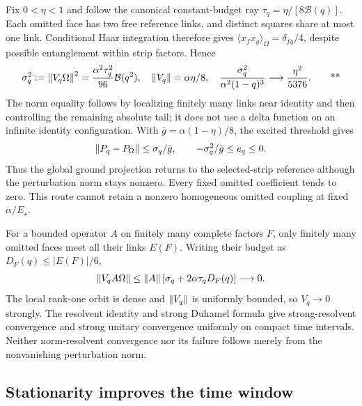Fix \(0<\eta<1\) and follow the canonical constant-budget ray
\(\tau_q=\eta/[8\mathcal B(q)]\).
Each omitted face has two free reference links, and distinct squares
share at most one link. Conditional Haar integration therefore gives
\(\langle x_fx_g\rangle_\Omega=\delta_{fg}/4\), despite possible
entanglement within strip factors. Hence
\begin{equation}
 \sigma_q^2:=\left\lVert V_q\Omega\right\rVert^2
 =\frac{\alpha^2\tau_q^2}{96}\mathcal B(q^2),\quad
 \left\lVert V_q\right\rVert=\alpha\eta/8,\quad
 \frac{\sigma_q^2}{\alpha^2(1-q)^3}\longrightarrow\frac{\eta^2}{5376}.
 \qquad\text{**}
 \label{eq:middle-variance}
\end{equation}
The norm equality follows by localizing finitely many links near identity
and then controlling the remaining absolute tail; it does not use a
delta function on an infinite identity configuration.
With \(\bar g=\alpha(1-\eta)/8\), the excited threshold gives
\[
 \left\lVert P_q-P_\Omega\right\rVert\le\sigma_q/\bar g,\qquad
 -\sigma_q^2/\bar g\le e_q\le0.
\]
Thus the global ground projection returns to the selected-strip reference
although the perturbation norm stays nonzero. Every fixed omitted
coefficient tends to zero. This route cannot retain a nonzero homogeneous
omitted coupling at fixed \(\alpha/E_\star\).

For a bounded operator \(A\) on finitely many complete factors \(F\),
only finitely many omitted faces meet all their links \(E(F)\).
Writing their budget as \(D_F(q)\le|E(F)|/6\),
\[
 \left\lVert V_qA\Omega\right\rVert
 \le\left\lVert A\right\rVert[\sigma_q+2\alpha\tau_qD_F(q)]\longrightarrow0.
\]
The local rank-one orbit is dense and \(\left\lVert V_q\right\rVert\) is uniformly bounded,
so \(V_q\to0\) strongly. The resolvent identity and strong Duhamel formula
give strong-resolvent convergence and strong unitary convergence uniformly
on compact time intervals. Neither norm-resolvent convergence nor its
failure follows merely from the nonvanishing perturbation norm.

\subsection{Stationarity improves the time window \workstar}
\label{sec:middle-windows}


